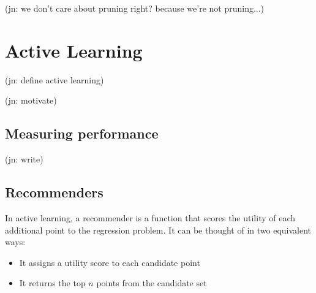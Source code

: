 \documentclass[11pt,twoside]{report}
\newcommand\jn[1]{{\color{red}(jn: #1)}}
\begin{document}
\jn{we don't care about pruning right? because we're not pruning...}

\chapter{Active Learning}

\jn{define active learning}

\jn{motivate}

\section{Measuring performance}

\jn{write}

\section{Recommenders}

In active learning, a recommender is a function that scores the utility of each additional point to the regression problem. It can be thought of in two equivalent ways:\begin{itemize}
    \item It assigns a utility score to each candidate point
    \item It returns the top $n$ points from the candidate set
\end{itemize}
\end{document}
